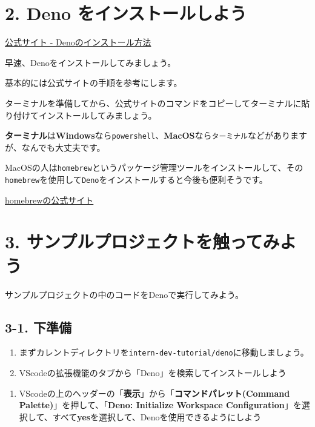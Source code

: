 \section{2. Deno
をインストールしよう}\label{deno-ux3092ux30a4ux30f3ux30b9ux30c8ux30fcux30ebux3057ux3088ux3046}

\href{https://deno.land/manual@v1.35.0/getting_started/installation}{公式サイト
- Denoのインストール方法}

早速、Denoをインストールしてみましょう。

基本的には公式サイトの手順を参考にします。

ターミナルを準備してから、公式サイトのコマンドをコピーしてターミナルに貼り付けてインストールしてみましょう。

\textbf{ターミナル}は\textbf{Windows}なら\texttt{powershell}、\textbf{MacOS}なら\texttt{ターミナル}などがありますが、なんでも大丈夫です。

MacOSの人は\texttt{homebrew}というパッケージ管理ツールをインストールして、その\texttt{homebrew}を使用して\texttt{Deno}をインストールすると今後も便利そうです。

\href{https://brew.sh/index_ja}{homebrewの公式サイト}

\section{3.
サンプルプロジェクトを触ってみよう}\label{ux30b5ux30f3ux30d7ux30ebux30d7ux30edux30b8ux30a7ux30afux30c8ux3092ux89e6ux3063ux3066ux307fux3088ux3046}

サンプルプロジェクトの中のコードをDenoで実行してみよう。

\subsection{3-1. 下準備}\label{ux4e0bux6e96ux5099}

\begin{enumerate}
\def\labelenumi{\arabic{enumi}.}
\item
  まずカレントディレクトリを\texttt{intern-dev-tutorial/deno}に移動しましょう。
\item
  VScodeの拡張機能のタブから「Deno」を検索してインストールしよう
\end{enumerate}

\begin{enumerate}
\def\labelenumi{\arabic{enumi}.}
\setcounter{enumi}{2}
\tightlist
\item
  VScodeの上のヘッダーの「\textbf{表示}」から「\textbf{コマンドパレット(Command
  Palette)}」を押して、「\textbf{Deno: Initialize Workspace
  Configuration}」を選択して、すべて\textbf{yes}を選択して、Denoを使用できるようにしよう
\end{enumerate}

